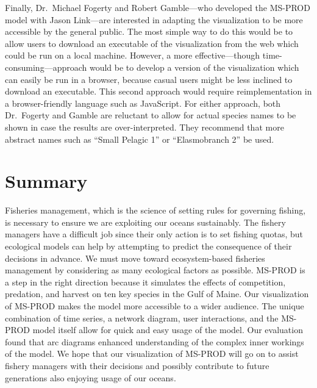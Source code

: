Finally, Dr.\ Michael Fogerty and Robert Gamble---who developed the MS-PROD model with Jason Link---are interested in adapting the visualization to be more accessible by the general public.  The most simple way to do this would be to allow users to download an executable of the visualization from the web which could be run on a local machine.  However, a more effective---though time-consuming---approach would be to develop a version of the visualization which can easily be run in a browser, because casual users might be less inclined to download an executable.  This second approach would require reimplementation in a browser-friendly language such as JavaScript.  For either approach, both Dr.\ Fogerty and Gamble are reluctant to allow for actual species names to be shown in case the results are over-interpreted.  They recommend that more abstract names such as ``Small Pelagic 1''  or ``Elasmobranch 2'' be used.

\section{Summary}

Fisheries management, which is the science of setting rules for governing fishing, is necessary to ensure we are exploiting our oceans sustainably.  The fishery managers have a difficult job since their only action is to set fishing quotas, but ecological models can help by attempting to predict the consequence of their decisions in advance.  We must move toward ecosystem-based fisheries management by considering as many ecological factors as possible.  MS-PROD is a step in the right direction because it simulates the effects of competition, predation, and harvest on ten key species in the Gulf of Maine. Our visualization of MS-PROD makes the model more accessible to a wider audience.  The unique combination of time series, a network diagram, user interactions, and the MS-PROD model itself allow for quick and easy usage of the model.  Our evaluation found that arc diagrams enhanced understanding of the complex inner workings of the model.  We hope that our visualization of MS-PROD will go on to assist fishery managers with their decisions and possibly contribute to future generations also enjoying usage of our oceans.
